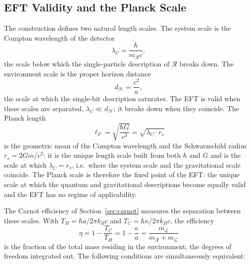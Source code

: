 \subsection{EFT Validity and the Planck Scale}
\label{sec:eft_validity}

The construction defines two natural length scales. 
The system scale is the Compton wavelength of the 
detector
%
\begin{equation}
\lambda_C = \frac{\hbar}{m_\mathcal{R} c},
\end{equation}
%
the scale below which the single-particle 
description of $\mathcal{R}$ breaks down. The 
environment scale is the proper horizon distance
%
\begin{equation}
d_\mathcal{H} = \frac{c^2}{a},
\end{equation}
%
the scale at which the single-bit description 
saturates. The EFT is valid when these scales are 
separated, $\lambda_C \ll d_\mathcal{H}$; it 
breaks down when they coincide. The Planck length
%
\begin{equation}
\ell_P = \sqrt{\frac{\hbar G}{c^3}} 
       = \sqrt{\lambda_C \cdot r_s}
\label{eq:planck_geometric_mean}
\end{equation}
%
is the geometric mean of the Compton wavelength 
and the Schwarzschild radius $r_s = 2Gm/c^2$: 
it is the unique length scale built from both 
$\hbar$ and $G$ and is the scale at which 
$\lambda_C = r_s$, i.e.\ where the system scale 
and the gravitational scale coincide. The Planck 
scale is therefore the fixed point of the EFT: 
the unique scale at which the quantum and 
gravitational descriptions become equally valid 
and the EFT has no regime of applicability.

The Carnot efficiency of Section~\ref{sec:carnot}
measures the separation between these scales. 
With $T_H = \hbar a/2\pi k_Bc$ and $T_C = 
\hbar\kappa/2\pi k_Bc$, the efficiency
%
\begin{equation}
\eta = 1 - \frac{T_C}{T_H} 
     = 1 - \frac{\kappa}{a}
     = \frac{m_\mathcal{L}}
            {m_\mathcal{R} + m_\mathcal{L}}
\label{eq:eta_mass}
\end{equation}
%
is the fraction of the total mass residing in 
the environment, the degrees of freedom 
integrated out. The following conditions are 
simultaneously equivalent:

